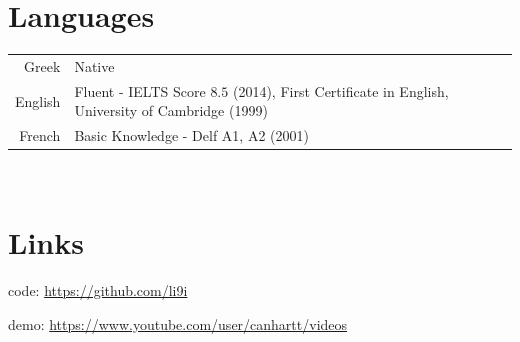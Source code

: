 \documentclass[a4paper,10pt,twoside]{article}
\begin{document}

\section{Languages}

\begin{tabular}{rp{12cm}}
Greek & Native \\
English & Fluent - IELTS Score $8.5$ (2014), First Certificate in English, University of Cambridge (1999) \\
French & Basic Knowledge - Delf A1, A2 (2001)
\end{tabular} \\



\section{Links}
code: \url{https://github.com/li9i}

demo: \url{https://www.youtube.com/user/canhartt/videos}
\end{document}
